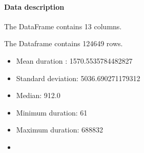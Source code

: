 \documentclass[11pt,a4paper]{article}
\begin{document}
\paragraph{Data description}

%
%

%
The DataFrame contains 13 columns. 




The Dataframe contains 124649 rows.

%
%

\begin{itemize}
\item  Mean duration :           1570.5535784482827
\item Standard deviation:     5036.690271179312
\item Median:                          912.0
\item Minimum duration:      61
\item Maximum duration:    688832
\item 
\end{itemize}


\end{document}
